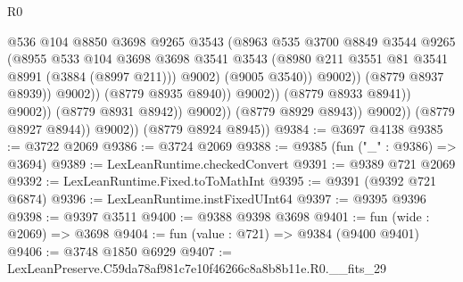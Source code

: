 \begin{lexlean}{R0}
\begin{coremodule}
                                              @536
                                              @104
                                              @8850
                                              @3698
                                              @9265
                                              @3543
                                              (@8963
                                                @535
                                                @3700
                                                @8849
                                                @3544
                                                @9265
                                                (@8955
                                                  @533
                                                  @104
                                                  @3698
                                                  @3698
                                                  @3541
                                                  @3543
                                                  (@8980
                                                    @211
                                                    @3551
                                                    @81
                                                    @3541
                                                    @8991
                                                    (@3884 (@8997 @211)))
                                                  @9002)
                                                (@9005 @3540))
                                              @9002))
                                          (@8779 @8937 @8939))
                                        @9002))
                                    (@8779 @8935 @8940))
                                  @9002))
                              (@8779 @8933 @8941))
                            @9002))
                        (@8779 @8931 @8942))
                      @9002))
                  (@8779 @8929 @8943))
                @9002))
            (@8779 @8927 @8944))
          @9002))
      (@8779 @8924 @8945))
@9384 := @3697 @4138
@9385 := @3722 @2069
@9386 := @3724 @2069
@9388 := @9385 (fun ("_" : @9386) => @3694)
@9389 := LexLeanRuntime.checkedConvert
@9391 := @9389 @721 @2069
@9392 := LexLeanRuntime.Fixed.toToMathInt
@9395 := @9391 (@9392 @721 @6874)
@9396 := LexLeanRuntime.instFixedUInt64
@9397 := @9395 @9396
@9398 := @9397 @3511
@9400 := @9388 @9398 @3698
@9401 := fun (wide : @2069) => @3698
@9404 := fun (value : @721) => @9384 (@9400 @9401)
@9406 := @3748 @1850 @6929
@9407 := LexLeanPreserve.C59da78af981c7e10f46266c8a8b8b11e.R0.__fits_29

\end{coremodule}
\end{lexlean}
